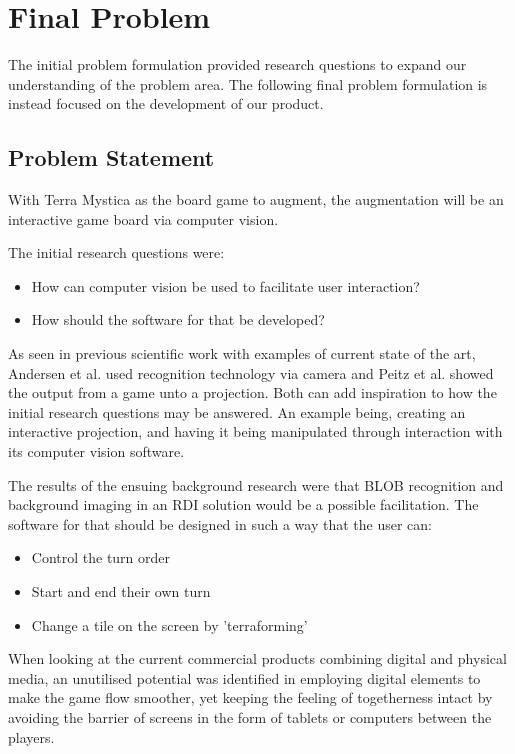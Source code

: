 \chapter{Final Problem}\label{ch:finprob}
The initial problem formulation provided research questions to expand our understanding of the problem area. The following final problem formulation is instead focused on the development of our product.

\section{Problem Statement}
With Terra Mystica as the board game to augment, the augmentation will be an interactive game board via computer vision.

The initial research questions were:
\begin{itemize}
	\item How can computer vision be used to facilitate user interaction?
	\item How should the software for that be developed?
\end{itemize}

As seen in previous scientific work with examples of current state of the art, Andersen et al. \citep{andersen_designing_2004} used recognition technology via camera and Peitz et al. \citep{peitzWizards2006} showed the output from a game unto a projection. Both can add inspiration to how the initial research questions may be answered. An example being, creating an interactive projection, and having it being manipulated through interaction with its computer vision software.

The results of the ensuing background research were that BLOB recognition and background imaging in an RDI solution would be a possible facilitation.
The software for that should be designed in such a way that the user can:
\begin{itemize}
\item Control the turn order
\item Start and end their own turn
\item Change a tile on the screen by 'terraforming'
\end{itemize}

When looking at the current commercial products combining digital and physical media, an unutilised potential was identified in employing digital elements to make the game flow smoother, yet keeping the feeling of togetherness intact by avoiding the barrier of screens in the form of tablets or computers between the players. 

